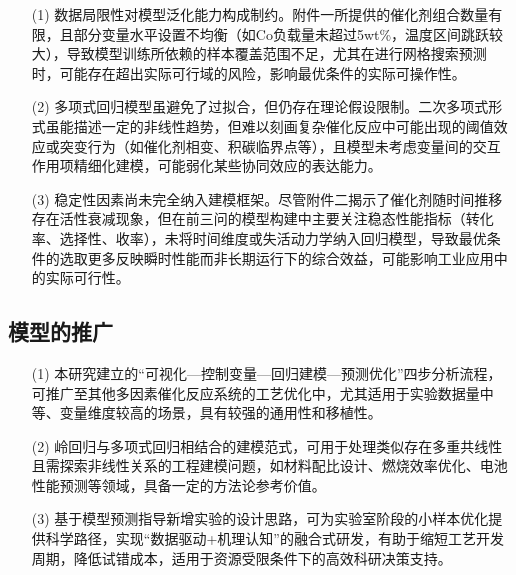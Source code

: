 \begin{itemize}
	
	\item[(1)] 数据局限性对模型泛化能力构成制约。附件一所提供的催化剂组合数量有限，且部分变量水平设置不均衡（如Co负载量未超过5wt\%，温度区间跳跃较大），导致模型训练所依赖的样本覆盖范围不足，尤其在进行网格搜索预测时，可能存在超出实际可行域的风险，影响最优条件的实际可操作性。
	
	\item[(2)] 多项式回归模型虽避免了过拟合，但仍存在理论假设限制。二次多项式形式虽能描述一定的非线性趋势，但难以刻画复杂催化反应中可能出现的阈值效应或突变行为（如催化剂相变、积碳临界点等），且模型未考虑变量间的交互作用项精细化建模，可能弱化某些协同效应的表达能力。
	
	\item[(3)] 稳定性因素尚未完全纳入建模框架。尽管附件二揭示了催化剂随时间推移存在活性衰减现象，但在前三问的模型构建中主要关注稳态性能指标（转化率、选择性、收率），未将时间维度或失活动力学纳入回归模型，导致最优条件的选取更多反映瞬时性能而非长期运行下的综合效益，可能影响工业应用中的实际可行性。
	
\end{itemize}	
\subsection{模型的推广}


\begin{itemize}
	
	\item[(1)] 本研究建立的“可视化—控制变量—回归建模—预测优化”四步分析流程，可推广至其他多因素催化反应系统的工艺优化中，尤其适用于实验数据量中等、变量维度较高的场景，具有较强的通用性和移植性。
	
	\item[(2)] 岭回归与多项式回归相结合的建模范式，可用于处理类似存在多重共线性且需探索非线性关系的工程建模问题，如材料配比设计、燃烧效率优化、电池性能预测等领域，具备一定的方法论参考价值。
	
	\item[(3)] 基于模型预测指导新增实验的设计思路，可为实验室阶段的小样本优化提供科学路径，实现“数据驱动+机理认知”的融合式研发，有助于缩短工艺开发周期，降低试错成本，适用于资源受限条件下的高效科研决策支持。
	
\end{itemize}	